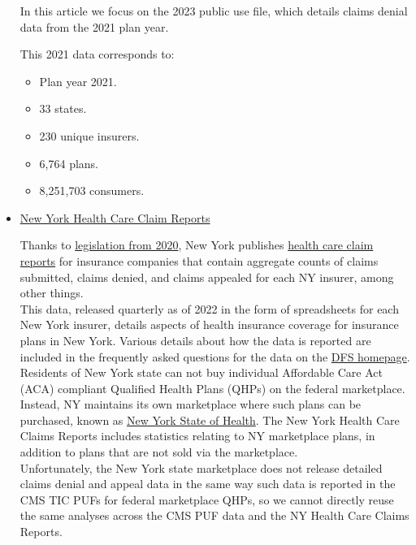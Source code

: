\documentclass[12pt, a4paper,twoside]{report}
\theoremstyle{plain} %
\theoremstyle{definition} %
\theoremstyle{remark} %
\numberwithin{equation}{chapter}
\begin{document}
\begin{itemize}
\begin{tcolorbox}
			In this article we focus on the 2023 public use file, which details claims denial data from the 2021 plan year.
			
			This 2021 data corresponds to:
			
			\begin{itemize}
				\item Plan year 2021.
				\item 33 states.
				\item 230 unique insurers.
				\item 6,764 plans.
				\item 8,251,703 consumers.
			\end{itemize}
		
			\end{tcolorbox}
			\item \href{https://www.dfs.ny.gov/reports_and_publications/health_care_claim_reports}{New York Health Care Claim Reports}\\
			
			\begin{tcolorbox}
			Thanks to \href{https://www.nysenate.gov/legislation/laws/ISC/345}{legislation from 2020}, New York publishes \href{https://www.dfs.ny.gov/reports_and_publications/health_care_claim_reports}{health care claim reports} for insurance companies that contain aggregate counts of claims submitted, claims denied, and claims appealed for each NY insurer, among other things. \\
			
			This data, released quarterly as of 2022 in the form of spreadsheets for each New York insurer, details aspects of health insurance coverage for insurance plans in New York. Various details about how the data is reported are included in the frequently asked questions for the data on the \href{https://www.dfs.ny.gov/apps_and_licensing/health_care_claim_reports}{DFS homepage}. \\
			
			Residents of New York state can not buy individual Affordable Care Act (ACA) compliant Qualified Health Plans (QHPs) on the federal marketplace. Instead, NY maintains its own marketplace where such plans can be purchased, known as \href{https://nystateofhealth.ny.gov/}{New York State of Health}. The New York Health Care Claims Reports includes statistics relating to NY marketplace plans, in addition to plans that are not sold via the marketplace. \\
			
			Unfortunately, the New York state marketplace does not release detailed claims denial and appeal data in the same way such data is reported in the CMS TIC PUFs for federal marketplace QHPs, so we cannot directly reuse the same analyses across the CMS PUF data and the NY Health Care Claims Reports.\\
			

\end{tcolorbox}
\end{itemize}
\end{document}
